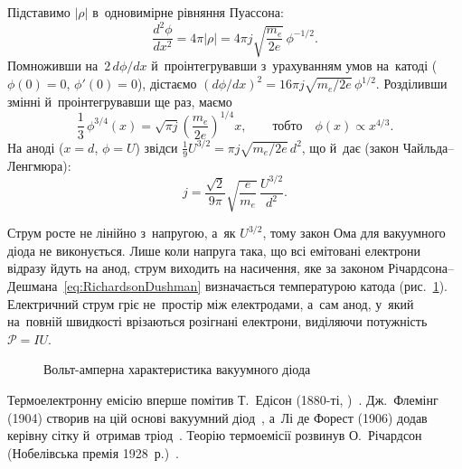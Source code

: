 Підставимо $|\rho|$ в~одновимірне рівняння Пуассона:
\begin{equation*}
	\frac{d^2\phi}{dx^2} = 4\pi |\rho| = 4\pi j \sqrt{\frac{m_e}{2e}} \, \phi^{-1/2}.
\end{equation*}
Помноживши на~$2\,d\phi/dx$ й~проінтегрувавши з~урахуванням умов на~катоді ($\phi(0)=0$,
$\phi'(0)=0$), дістаємо $(d\phi/dx)^2 = 16\pi j \sqrt{m_e/2e}\,\phi^{1/2}$. Розділивши
змінні й~проінтегрувавши ще раз, маємо
\begin{equation*}
	\frac{1}{3}\,\phi^{3/4}(x) = \sqrt{\pi j} \left(\frac{m_e}{2e}\right)^{1/4} x, \qquad\text{тобто}\quad \phi(x)\propto x^{4/3}.
\end{equation*}
На аноді ($x=d$, $\phi=U$) звідси $\tfrac19 U^{3/2} = \pi j \sqrt{m_e/2e}\, d^2$, що й~дає
 (закон Чайльда--Ленгмюра):
\begin{equation}\label{eq:ChildLangmuir}
	j = \frac{\sqrt2}{9\pi}\sqrt{\frac{e}{m_e}}\,\frac{U^{3/2}}{d^2}.
\end{equation}

Струм росте не лінійно з~напругою, а~як $U^{3/2}$, тому закон Ома для вакуумного діода не
виконується. Лише коли напруга така, що всі емітовані електрони відразу йдуть на анод,
струм виходить на насичення, яке за законом
Річардсона--Дешмана~\eqref{eq:RichardsonDushman} визначається температурою катода
(рис.~\ref{pic:VacuumDiodeIV}). Електричний струм гріє не~простір між електродами, а~сам
анод, у~який на~повній швидкості врізаються розігнані електрони, виділяючи потужність
$\mathcal{P} = IU$.

\begin{figure}[h!]\centering
	\caption{Вольт-амперна характеристика вакуумного діода\label{pic:VacuumDiodeIV}}
\end{figure}

\begin{Historical}
	Термоелектронну емісію вперше помітив Т.~Едісон (1880-ті, )~\cite{Edison1884}.
	Дж.~Флемінг (1904) створив на цій основі вакуумний діод~\cite{Fleming1905}, а~Лі де Форест (1906) додав
	керівну сітку й~отримав тріод~\cite{DeForest1907}. Теорію термоемісії розвинув О.~Річардсон (Нобелівська
	премія 1928~р.)~\cite{Richardson1929Nobel}.
\end{Historical}


